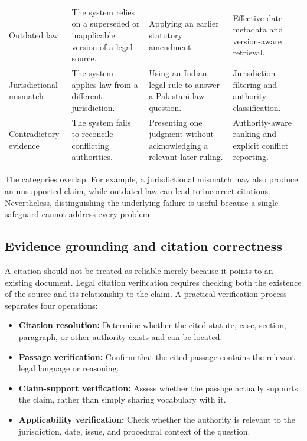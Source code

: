 \begin{table}[tp]
\begin{tabularx}{\textwidth}{>{\raggedright\arraybackslash}p{2.5cm} >{\raggedright\arraybackslash}X >{\raggedright\arraybackslash}X >{\raggedright\arraybackslash}X}
Outdated law & The system relies on a superseded or inapplicable version of a legal source. & Applying an earlier statutory amendment. & Effective-date metadata and version-aware retrieval. \\
Jurisdictional mismatch & The system applies law from a different jurisdiction. & Using an Indian legal rule to answer a Pakistani-law question. & Jurisdiction filtering and authority classification. \\
Contradictory evidence & The system fails to reconcile conflicting authorities. & Presenting one judgment without acknowledging a relevant later ruling. & Authority-aware ranking and explicit conflict reporting. \\
\bottomrule
\end{tabularx}
\end{table}

The categories overlap. For example, a jurisdictional mismatch may also produce an unsupported claim,
while outdated law can lead to incorrect citations. Nevertheless, distinguishing the underlying failure
is useful because a single safeguard cannot address every problem.

\subsection{Evidence grounding and citation correctness}

A citation should not be treated as reliable merely because it points to an existing document. Legal
citation verification requires checking both the existence of the source and its relationship to the
claim. A practical verification process separates four operations:
\begin{itemize}[leftmargin=1.4em, itemsep=2pt, topsep=2pt]
\item \textbf{Citation resolution:} Determine whether the cited statute, case, section, paragraph, or
other authority exists and can be located.
\item \textbf{Passage verification:} Confirm that the cited passage contains the relevant legal
language or reasoning.
\item \textbf{Claim-support verification:} Assess whether the passage actually supports the claim,
rather than simply sharing vocabulary with it.
\item \textbf{Applicability verification:} Check whether the authority is relevant to the jurisdiction,
date, issue, and procedural context of the question.
\end{itemize}

